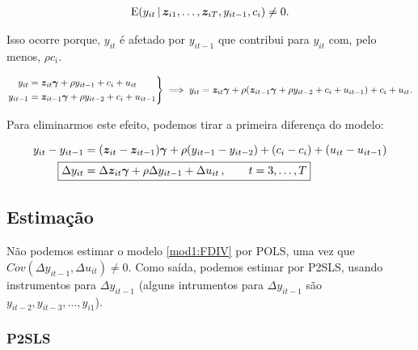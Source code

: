 \documentclass[11pt, oneside, a4paper, article]{article}
\numberwithin{equation}{section}
\begin{document}
\begin{description}
\vspace{-1.5 em}
\begin{align*}
	\text{E}( y_{it} \, | \, \boldsymbol{z}_{i1}, \dots, \boldsymbol{z}_{iT}, y_{it-1}, c_{i}) \neq 0.
\end{align*}

\noindent
Isso ocorre porque, $y_{it}$ é afetado por $y_{it-1}$ que contribui para $y_{it}$ com, pelo menos, $\rho c_{i}$.

\begin{equation*}
\left.
\begin{aligned}
y_{it} &= \boldsymbol{z}_{it} \boldsymbol{\gamma} + \rho y_{i t - 1} + c_{i} + u_{it}
\\
y_{it-1} &= \boldsymbol{z}_{it-1} \boldsymbol{\gamma} + \rho y_{i t - 2} + c_{i} + u_{it-1}
\end{aligned}
\right\} 
\implies
y_{it} = \boldsymbol{z}_{it} \boldsymbol{\gamma} +
\rho (\boldsymbol{z}_{it-1} \boldsymbol{\gamma} + \rho y_{i t - 2} + c_{i} + u_{it-1})
+ c_{i} + u_{it}.
\end{equation*}

Para eliminarmos este efeito, podemos tirar a primeira diferença do modelo:

\vspace{-1 em}
\begin{align}
\nonumber
y_{it} - y_{it-1} &= 
(\mbs{z}_{it} - \mbs{z}_{it-1}) \mbs{\gamma} +
\rho (y_{i t - 1} -  y_{i t - 2} ) +
(c_{i} - c_{i}) + (u_{it} - u_{it-1})
\\
\label{mod1:FDIV}
\Aboxed{
\Delta y_{it} &= 
\Delta \mbs{z}_{it} \mbs{\gamma} + \rho \Delta y_{i t - 1} + \Delta u_{it}
\, , \qquad t=3, \dots, T}
\end{align}

\subsection{Estimação}

Não podemos estimar o modelo \eqref{mod1:FDIV} por POLS, uma vez que $Cov(\Delta y_{it-1}, \Delta u_{it} ) \neq 0$.
Como saída, podemos estimar por P2SLS, usando instrumentos para $\Delta y_{it-1}$ (alguns intrumentos para $\Delta y_{it-1}$ são $y_{it-2}, y_{it-3}, \dots, y_{i1}$).

\subsubsection{P2SLS}


\end{description}
\end{document}
